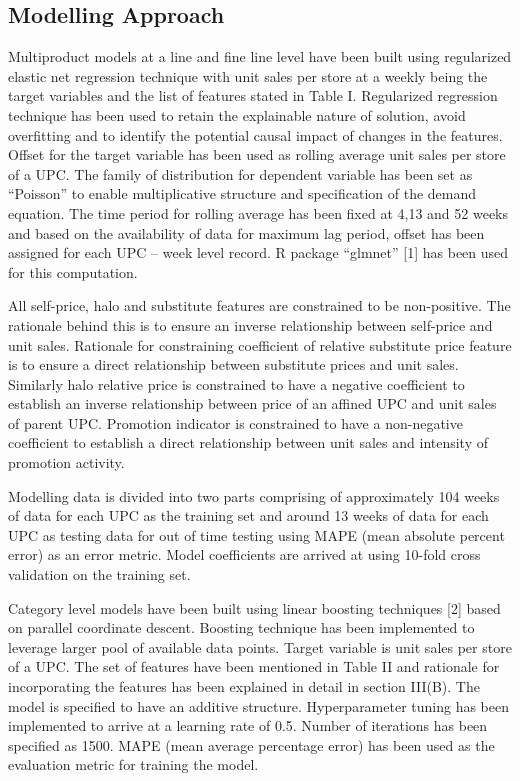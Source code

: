 \subsection{Modelling Approach}
Multiproduct models at a line and fine line level have been built using regularized elastic net regression 
technique with unit sales per store at a weekly being the target variables and the list of features stated in Table I. 
Regularized regression technique has been used to retain the explainable nature of solution, avoid overfitting and to 
identify the potential causal impact of changes in the features. Offset for the target variable has been used as rolling 
average unit sales per store of a UPC. The family of distribution for dependent variable has been set as “Poisson” to 
enable multiplicative structure and specification of the demand equation. The time period for rolling average has been 
fixed at 4,13 and 52 weeks and based on the availability of data for maximum lag period, offset has been assigned for 
each UPC – week level record. R package “glmnet” [1] has been used for this computation. 

All self-price, halo and substitute features are constrained to be non-positive. The rationale behind this is to 
ensure an inverse relationship between self-price and unit sales. Rationale for constraining coefficient of relative 
substitute price feature is to ensure a direct relationship between substitute prices and unit sales. Similarly halo 
relative price is constrained to have a negative coefficient to establish an inverse relationship between price of an 
affined UPC and unit sales of parent UPC.  Promotion indicator is constrained to have a non-negative coefficient to 
establish a direct relationship between unit sales and intensity of promotion activity. 

Modelling data is divided into two parts comprising of approximately 104 weeks of data for each UPC as the training 
set and around 13 weeks of data for each UPC as testing data for out of time testing using MAPE (mean absolute percent error) 
as an error metric.  Model coefficients are arrived at using 10-fold cross validation on the training set.

Category level models have been built using linear boosting techniques [2] based on parallel coordinate descent. 
Boosting technique has been implemented to leverage larger pool of available data points. Target variable is unit 
sales per store of a UPC. The set of features have been mentioned in Table II and rationale for incorporating the 
features has been explained in detail in section III(B). The model is specified to have an additive structure.
Hyperparameter tuning has been implemented to arrive at a learning rate of 0.5. Number of iterations has been specified as 
1500. MAPE (mean average percentage error) has been used as the evaluation metric for training the model.

